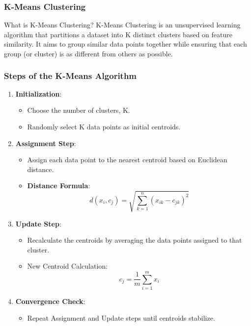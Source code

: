 \documentclass[aspectratio=169]{beamer}
\begin{document}
\begin{frame}[fragile]
    \frametitle{K-Means Clustering}
    \begin{block}{What is K-Means Clustering?}
        K-Means Clustering is an unsupervised learning algorithm that partitions a dataset into K distinct clusters based on feature similarity. It aims to group similar data points together while ensuring that each group (or cluster) is as different from others as possible.
    \end{block}
\end{frame}

\begin{frame}[fragile]
    \frametitle{Steps of the K-Means Algorithm}
    \begin{enumerate}
        \item \textbf{Initialization}:
        \begin{itemize}
            \item Choose the number of clusters, K.
            \item Randomly select K data points as initial centroids.
        \end{itemize}
        
        \item \textbf{Assignment Step}:
        \begin{itemize}
            \item Assign each data point to the nearest centroid based on Euclidean distance.
            \item \textbf{Distance Formula}: 
            \begin{equation}
                d(x_i, c_j) = \sqrt{\sum_{k=1}^{n} (x_{ik} - c_{jk})^2}
            \end{equation}
        \end{itemize}
        
        \item \textbf{Update Step}:
        \begin{itemize}
            \item Recalculate the centroids by averaging the data points assigned to that cluster.
            \item New Centroid Calculation:
            \begin{equation}
                c_j = \frac{1}{m} \sum_{i=1}^{m} x_i
            \end{equation}
        \end{itemize}
        
        \item \textbf{Convergence Check}:
        \begin{itemize}
            \item Repeat Assignment and Update steps until centroids stabilize.
        \end{itemize}
    \end{enumerate}
\end{frame}
\end{document}
